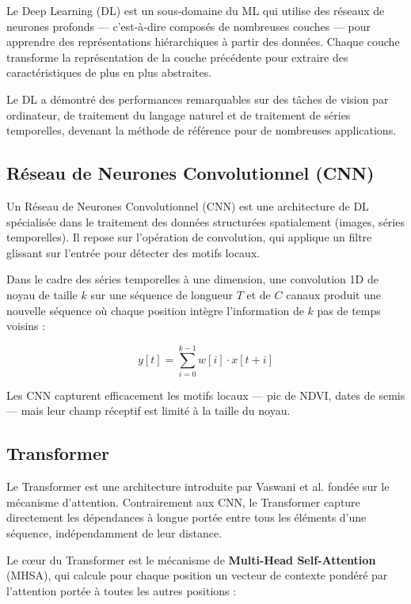 Le Deep Learning (DL) est un sous-domaine du ML qui utilise des réseaux de
neurones profonds — c'est-à-dire composés de nombreuses couches — pour
apprendre des représentations hiérarchiques à partir des données. Chaque
couche transforme la représentation de la couche précédente pour extraire des
caractéristiques de plus en plus abstraites.

Le DL a démontré des performances remarquables sur des tâches de vision par
ordinateur, de traitement du langage naturel et de traitement de séries
temporelles, devenant la méthode de référence pour de nombreuses applications.

\subsection{Réseau de Neurones Convolutionnel (CNN)}

Un Réseau de Neurones Convolutionnel (CNN) est une architecture de DL
spécialisée dans le traitement des données structurées spatialement (images,
séries temporelles). Il repose sur l'opération de convolution, qui applique
un filtre glissant sur l'entrée pour détecter des motifs locaux.

Dans le cadre des séries temporelles à une dimension, une convolution 1D
de noyau de taille $k$ sur une séquence de longueur $T$ et de $C$ canaux
produit une nouvelle séquence où chaque position intègre l'information de
$k$ pas de temps voisins :

\begin{equation}
  y[t] = \sum_{i=0}^{k-1} w[i] \cdot x[t+i]
  \label{eq:conv1d}
\end{equation}

Les CNN capturent efficacement les motifs locaux — pic de NDVI, dates de
semis — mais leur champ réceptif est limité à la taille du noyau.

\subsection{Transformer}

Le Transformer est une architecture introduite par Vaswani et al. \cite{vaswani2017}
fondée sur le mécanisme d'attention. Contrairement aux CNN, le Transformer
capture directement les dépendances à longue portée entre tous les éléments
d'une séquence, indépendamment de leur distance.

Le cœur du Transformer est le mécanisme de \textbf{Multi-Head Self-Attention}
(MHSA), qui calcule pour chaque position un vecteur de contexte pondéré par
l'attention portée à toutes les autres positions :

